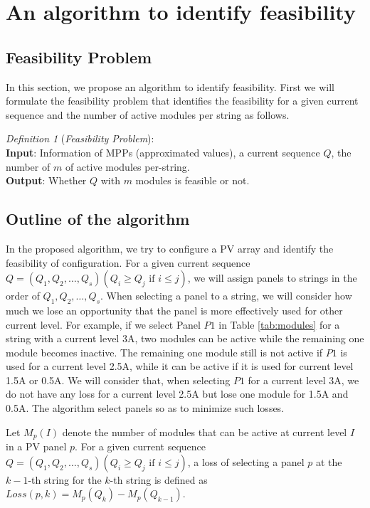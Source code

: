 \documentclass[conference]{pvsctran}
\begin{document}
\section{An algorithm to identify feasibility}\label{Sec5}
\subsection{Feasibility Problem}\label{Sec5_1}
In this section, we propose an algorithm to identify feasibility.
First we will formulate the feasibility problem that identifies the feasibility for a given current sequence and the number of active modules per string as follows.

\textit{Definition 1} (\textit{Feasibility Problem}):\\
\textbf{Input}: Information of MPPs (approximated values), a current sequence $Q$, the number of $m$ of active modules per-string.\\
\textbf{Output}: Whether $Q$ with $m$ modules is feasible or not.

\subsection{Outline of the algorithm}
In the proposed algorithm, we try to configure a PV array and identify the feasibility of configuration.
For a given current sequence $Q = (Q_{1},Q_{2},\ldots ,Q_{s}) (Q_{i} \geq Q_{j} \mbox{\ if\ } i \leq j)$, we will assign panels to strings in the order of $Q_{1},Q_{2},\ldots ,Q_{s}$. 
When selecting a panel to a string, we will consider how much we lose an opportunity that the panel is more effectively used for other current level. 
For example, if we select Panel $P1$ in Table \ref{tab:modules} for a string with a current level 3A, two modules can be active while the remaining one module becomes inactive. 
The remaining one module still is not active if $P1$ is used for a current level 2.5A, while it can be active if it is used for current level 1.5A or 0.5A. 
We will consider that, when selecting $P1$ for a current level 3A, we do not have any loss for a current level 2.5A but lose one module for 1.5A and 0.5A. 
The algorithm select panels so as to minimize such losses. 

Let $M_{p}(I)$ denote the number of modules that can be active at current level $I$ in a PV panel $p$. 
For a given current sequence $Q = (Q_{1},Q_{2},\ldots ,Q_{s}) (Q_{i} \geq Q_{j} \mbox{\ if\ } i \leq j)$, 
a loss of selecting a panel $p$ at the $k-1$-th string for the $k$-th string is defined as 
$Loss(p,k) = M_{p}(Q_{k}) - M_{p}(Q_{k-1})$. 
\end{document}

